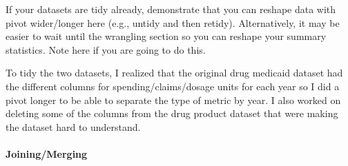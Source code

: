\documentclass[
]{article}
\newenvironment{Shaded}{\begin{snugshade}}{\end{snugshade}}
\newcommand{\DataTypeTok}[1]{\textcolor[rgb]{0.13,0.29,0.53}{#1}}
\newcommand{\DecValTok}[1]{\textcolor[rgb]{0.00,0.00,0.81}{#1}}
\newcommand{\KeywordTok}[1]{\textcolor[rgb]{0.13,0.29,0.53}{\textbf{#1}}}
\newcommand{\NormalTok}[1]{#1}
\newcommand{\OperatorTok}[1]{\textcolor[rgb]{0.81,0.36,0.00}{\textbf{#1}}}
\newcommand{\StringTok}[1]{\textcolor[rgb]{0.31,0.60,0.02}{#1}}
\begin{document}
If your datasets are tidy already, demonstrate that you can reshape data
with pivot wider/longer here (e.g., untidy and then retidy).
Alternatively, it may be easier to wait until the wrangling section so
you can reshape your summary statistics. Note here if you are going to
do this.

\begin{Shaded}
\end{Shaded}

To tidy the two datasets, I realized that the original drug medicaid
dataset had the different columns for spending/claims/dosage units for
each year so I did a pivot longer to be able to separate the type of
metric by year. I also worked on deleting some of the columns from the
drug product dataset that were making the dataset hard to understand.

\hypertarget{joiningmerging}{%
\paragraph{Joining/Merging}\label{joiningmerging}}
\end{document}
